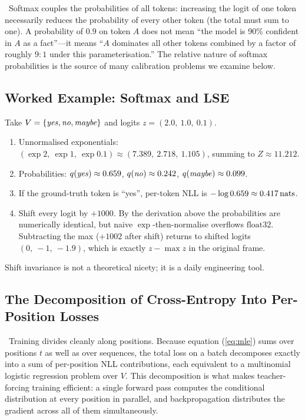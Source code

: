 \Cons\ Softmax couples the probabilities of all tokens: increasing the
logit of one token necessarily reduces the probability of every other
token (the total must sum to one). A probability of $0.9$ on token $A$
does not mean ``the model is 90\% confident in $A$ as a fact''---it
means ``$A$ dominates all other tokens combined by a factor of roughly
$9{:}1$ under this parameterisation.'' The relative nature of softmax
probabilities is the source of many calibration problems we examine
below.

\subsection{Worked Example: Softmax and LSE}

\begin{workedexample}
Take $V = \{\text{\emph{yes}}, \text{\emph{no}}, \text{\emph{maybe}}\}$
and logits $z = (2.0,\ 1.0,\ 0.1)$.
\begin{enumerate}
  \item Unnormalised exponentials: $(\exp 2,\ \exp 1,\ \exp 0.1)
  \approx (7.389,\ 2.718,\ 1.105)$, summing to $Z \approx 11.212$.
  \item Probabilities:
  $q(\text{\emph{yes}}) \approx 0.659$,
  $q(\text{\emph{no}}) \approx 0.242$,
  $q(\text{\emph{maybe}}) \approx 0.099$.
  \item If the ground-truth token is ``yes'', per-token NLL is
  $-\log 0.659 \approx 0.417\,\mathrm{nats}$.
  \item Shift every logit by $+1000$. By the derivation above the
  probabilities are numerically identical, but naive
  $\exp$-then-normalise overflows $\mathrm{float32}$. Subtracting the
  max ($+1002$ after shift) returns to shifted logits
  $(0,\ -1,\ -1.9)$, which is exactly $z - \max z$ in the original
  frame.
\end{enumerate}
Shift invariance is not a theoretical nicety; it is a daily
engineering tool.
\end{workedexample}

\subsection{The Decomposition of Cross-Entropy Into Per-Position Losses}

\Cons\ Training divides cleanly along positions. Because equation
(\ref{eq:mle}) sums over positions $t$ as well as over sequences, the
total loss on a batch decomposes exactly into a sum of per-position NLL
contributions, each equivalent to a multinomial logistic regression
problem over $V$. This decomposition is what makes teacher-forcing
training efficient: a single forward pass computes the conditional
distribution at every position in parallel, and backpropagation
distributes the gradient across all of them simultaneously.

